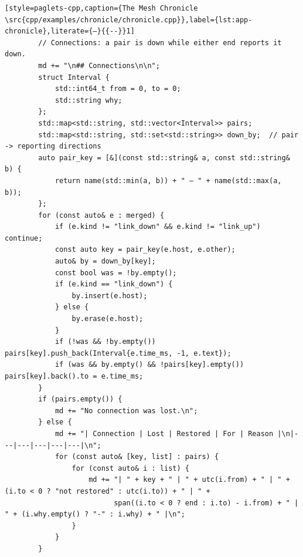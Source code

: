 \begin{lstlisting}[style=paglets-cpp,caption={The Mesh Chronicle \src{cpp/examples/chronicle/chronicle.cpp}},label={lst:app-chronicle},literate={–}{{--}}1]
        // Connections: a pair is down while either end reports it down.
        md += "\n## Connections\n\n";
        struct Interval {
            std::int64_t from = 0, to = 0;
            std::string why;
        };
        std::map<std::string, std::vector<Interval>> pairs;
        std::map<std::string, std::set<std::string>> down_by;  // pair -> reporting directions
        auto pair_key = [&](const std::string& a, const std::string& b) {
            return name(std::min(a, b)) + " – " + name(std::max(a, b));
        };
        for (const auto& e : merged) {
            if (e.kind != "link_down" && e.kind != "link_up") continue;
            const auto key = pair_key(e.host, e.other);
            auto& by = down_by[key];
            const bool was = !by.empty();
            if (e.kind == "link_down") {
                by.insert(e.host);
            } else {
                by.erase(e.host);
            }
            if (!was && !by.empty()) pairs[key].push_back(Interval{e.time_ms, -1, e.text});
            if (was && by.empty() && !pairs[key].empty()) pairs[key].back().to = e.time_ms;
        }
        if (pairs.empty()) {
            md += "No connection was lost.\n";
        } else {
            md += "| Connection | Lost | Restored | For | Reason |\n|---|---|---|---|---|\n";
            for (const auto& [key, list] : pairs) {
                for (const auto& i : list) {
                    md += "| " + key + " | " + utc(i.from) + " | " + (i.to < 0 ? "not restored" : utc(i.to)) + " | " +
                          span((i.to < 0 ? end : i.to) - i.from) + " | " + (i.why.empty() ? "-" : i.why) + " |\n";
                }
            }
        }


\end{lstlisting}
